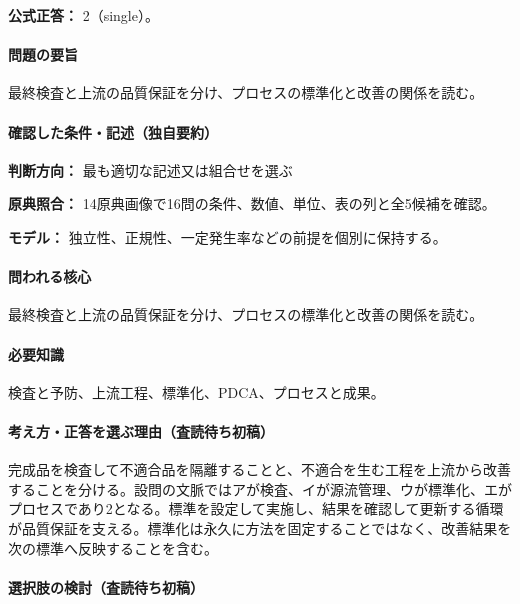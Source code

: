\textbf{公式正答：} 2（single）。

\paragraph{問題の要旨} 最終検査と上流の品質保証を分け、プロセスの標準化と改善の関係を読む。

\paragraph{確認した条件・記述（独自要約）}\mbox{}\par

\noindent\textbf{判断方向：} 最も適切な記述又は組合せを選ぶ\par

\noindent\textbf{原典照合：} 14原典画像で16問の条件、数値、単位、表の列と全5候補を確認。\par

\noindent\textbf{モデル：} 独立性、正規性、一定発生率などの前提を個別に保持する。\par

\paragraph{問われる核心} 最終検査と上流の品質保証を分け、プロセスの標準化と改善の関係を読む。

\paragraph{必要知識} 検査と予防、上流工程、標準化、PDCA、プロセスと成果。

\paragraph{考え方・正答を選ぶ理由（査読待ち初稿）} 完成品を検査して不適合品を隔離することと、不適合を生む工程を上流から改善することを分ける。設問の文脈ではアが検査、イが源流管理、ウが標準化、エがプロセスであり2となる。標準を設定して実施し、結果を確認して更新する循環が品質保証を支える。標準化は永久に方法を固定することではなく、改善結果を次の標準へ反映することを含む。

\paragraph{選択肢の検討（査読待ち初稿）}\mbox{}\par

